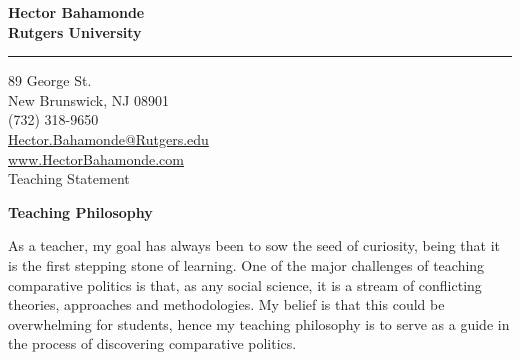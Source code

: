 \documentclass[11pt]{letter} %
\date{}
\begin{document}

\begin{letter}{} 


\begin{center}
\large\bf Hector Bahamonde \\ %
Rutgers University\\
\vspace{20pt} \hrule height 1pt %
89 George St. \\ New Brunswick, NJ 08901 \\ (732) 318-9650 \\ 
\href{mailto:hector.bahamonde@rutgers.edu}{Hector.Bahamonde@Rutgers.edu} \\
\href{http://www.hectorbahamonde.com}{www.HectorBahamonde.com}\\

{\huge\vspace{8mm} Teaching Statement}
\end{center} 

\signature{\vspace{1cm}h.b., fall 2016} %

\opening{} 
 
 {\bf Teaching Philosophy}

As a teacher, my goal has always been to sow the seed of curiosity, being that it is the first stepping stone of learning. One of the major challenges of teaching comparative politics is that, as any social science, it is a stream of conflicting theories, approaches and methodologies. My belief is that this could be overwhelming for students, hence my teaching philosophy is to serve as a guide in the process of discovering comparative politics.


\end{letter}
\end{document}
